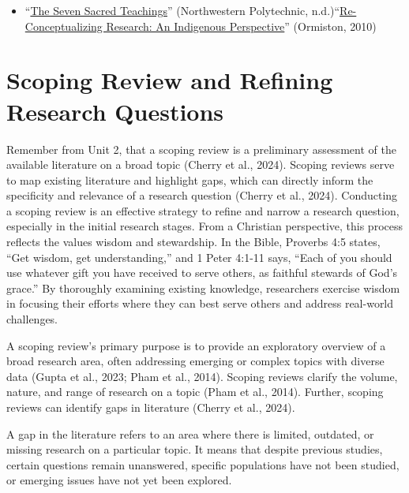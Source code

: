 \documentclass[
  letterpaper,
  DIV=11,
  numbers=noendperiod]{scrreprt}
\providecommand{\tightlist}{%
  \setlength{\itemsep}{0pt}\setlength{\parskip}{0pt}}\usepackage{longtable,booktabs,array}
\begin{document}
\begin{itemize}
\tightlist
\item
  ``\href{https://www.nwpolytech.ca/services/indigenous/sacred_teachings.html}{The
  Seven Sacred Teachings}'' (Northwestern Polytechnic,
  n.d.)``\href{https://fpcfr.com/index.php/FPCFR/article/view/173/142}{Re-Conceptualizing
  Research: An Indigenous Perspective}'' (Ormiston, 2010)
\end{itemize}


\chapter*{Scoping Review and Refining Research
Questions}\label{scoping-review-and-refining-research-questions}


Remember from Unit 2, that a scoping review is a preliminary assessment
of the available literature on a broad topic (Cherry et al., 2024).
Scoping reviews serve to map existing literature and highlight gaps,
which can directly inform the specificity and relevance of a research
question (Cherry et al., 2024). Conducting a scoping review is an
effective strategy to refine and narrow a research question, especially
in the initial research stages. From a Christian perspective, this
process reflects the values wisdom and stewardship. In the Bible,
Proverbs 4:5 states, ``Get wisdom, get understanding,'' and 1 Peter
4:1-11 says, ``Each of you should use whatever gift you have received to
serve others, as faithful stewards of God's grace.'' By thoroughly
examining existing knowledge, researchers exercise wisdom in focusing
their efforts where they can best serve others and address real-world
challenges.

A scoping review's primary purpose is to provide an exploratory overview
of a broad research area, often addressing emerging or complex topics
with diverse data (Gupta et al., 2023; Pham et al., 2014). Scoping
reviews clarify the volume, nature, and range of research on a topic
(Pham et al., 2014). Further, scoping reviews can identify gaps in
literature (Cherry et al., 2024).

A gap in the literature refers to an area where there is limited,
outdated, or missing research on a particular topic. It means that
despite previous studies, certain questions remain unanswered, specific
populations have not been studied, or emerging issues have not yet been
explored.
\end{document}
